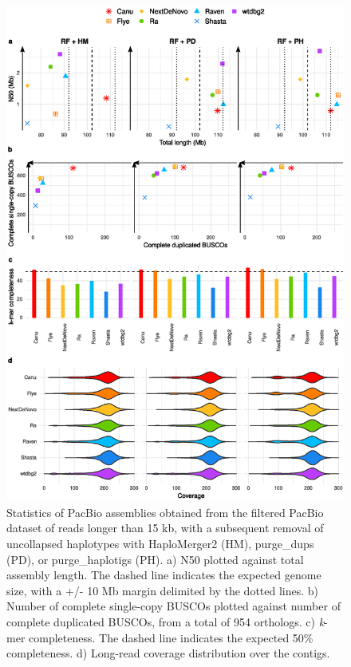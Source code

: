 \begin{suppsection}
    \begin{figure}[ht]
    \centering
     \includegraphics[width=13.5cm]{fig/benchmark/supp_pacbio_filtering_purging_v20201012.eps}
   \caption{Statistics of PacBio assemblies obtained from the filtered PacBio dataset of reads longer than 15 kb, with a subsequent removal of uncollapsed haplotypes with HaploMerger2 (HM), purge\_dups (PD), or purge\_haplotigs (PH). a) N50 plotted against total assembly length. The dashed line indicates the expected genome size, with a +/- 10 Mb margin delimited by the dotted lines. b) Number of complete single-copy BUSCOs plotted against number of complete duplicated BUSCOs, from a total of 954 orthologs. c) \textit{k}-mer completeness. The dashed line indicates the expected 50\% completeness. d) Long-read coverage distribution over the contigs.}
   \label{fig:pacbio_filtering_purging}
 \end{figure}
 

\end{suppsection}
